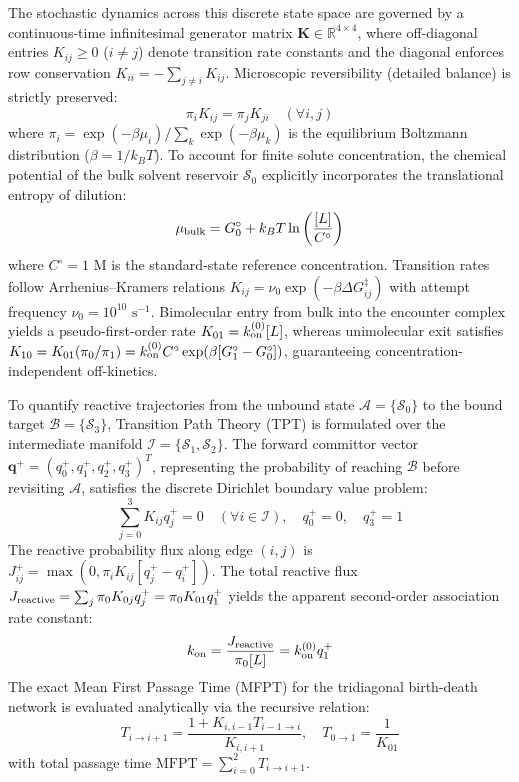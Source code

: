 \documentclass[journal=jpcbfk,manuscript=article,layout=twocolumn]{achemso}
\begin{document}
The stochastic dynamics across this discrete state space are governed by a continuous-time infinitesimal generator matrix $\mathbf{K} \in \mathbb{R}^{4 \times 4}$, where off-diagonal entries $K_{ij} \ge 0$ ($i \neq j$) denote transition rate constants and the diagonal enforces row conservation $K_{ii} = -\sum_{j \neq i} K_{ij}$. Microscopic reversibility (detailed balance) is strictly preserved:\cite{noe2009constructing}
\begin{equation}
\pi_i K_{ij} = \pi_j K_{ji} \quad (\forall i, j)
\end{equation}
where $\pi_i = \exp(-\beta \mu_i) / \sum_k \exp(-\beta \mu_k)$ is the equilibrium Boltzmann distribution ($\beta = 1/k_B T$). To account for finite solute concentration, the chemical potential of the bulk solvent reservoir $\mathcal{S}_0$ explicitly incorporates the translational entropy of dilution:
\begin{equation}
\mu_{\rm bulk} = G_0^\circ + k_B T \ln\left( \frac{[L]}{C^\circ} \right)
\end{equation}
where $C^\circ = 1\text{ M}$ is the standard-state reference concentration. Transition rates follow Arrhenius--Kramers relations $K_{ij} = \nu_0 \exp(-\beta \Delta G_{ij}^\ddagger)$ with attempt frequency $\nu_0 = 10^{10}\text{ s}^{-1}$. Bimolecular entry from bulk into the encounter complex yields a pseudo-first-order rate $K_{01} = k_{\rm on}^{(0)} [L]$, whereas unimolecular exit satisfies $K_{10} = K_{01} (\pi_0 / \pi_1) = k_{\rm on}^{(0)} C^\circ \exp(\beta [G_1^\circ - G_0^\circ])$, guaranteeing concentration-independent off-kinetics.

To quantify reactive trajectories from the unbound state $\mathcal{A} = \{\mathcal{S}_0\}$ to the bound target $\mathcal{B} = \{\mathcal{S}_3\}$, Transition Path Theory (TPT) is formulated over the intermediate manifold $\mathcal{I} = \{\mathcal{S}_1, \mathcal{S}_2\}$.\cite{vanden2006transition} The forward committor vector $\mathbf{q}^+ = (q_0^+, q_1^+, q_2^+, q_3^+)^T$, representing the probability of reaching $\mathcal{B}$ before revisiting $\mathcal{A}$, satisfies the discrete Dirichlet boundary value problem:
\begin{equation}
\sum_{j=0}^3 K_{ij} q_j^+ = 0 \quad (\forall i \in \mathcal{I}), \quad q_0^+ = 0, \quad q_3^+ = 1
\end{equation}
The reactive probability flux along edge $(i, j)$ is $J_{ij}^+ = \max(0, \pi_i K_{ij} [q_j^+ - q_i^+])$. The total reactive flux $J_{\rm reactive} = \sum_{j} \pi_0 K_{0j} q_j^+ = \pi_0 K_{01} q_1^+$ yields the apparent second-order association rate constant:
\begin{equation}
k_{\rm on} = \frac{J_{\rm reactive}}{\pi_0 [L]} = k_{\rm on}^{(0)} q_1^+
\end{equation}
The exact Mean First Passage Time (MFPT) for the tridiagonal birth-death network is evaluated analytically via the recursive relation:
\begin{equation}
T_{i \to i+1} = \frac{1 + K_{i, i-1} T_{i-1 \to i}}{K_{i, i+1}}, \quad T_{0 \to 1} = \frac{1}{K_{01}}
\end{equation}
with total passage time $\text{MFPT} = \sum_{i=0}^2 T_{i \to i+1}$.
\end{document}
